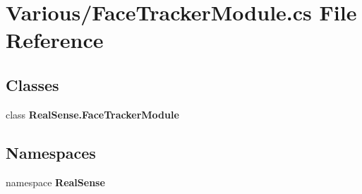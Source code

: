 \section{Various/\+Face\+Tracker\+Module.cs File Reference}
\label{_face_tracker_module_8cs}
\subsection*{Classes}
\begin{DoxyCompactItemize}
\item 
class \textbf{ Real\+Sense.\+Face\+Tracker\+Module}
\end{DoxyCompactItemize}
\subsection*{Namespaces}
\begin{DoxyCompactItemize}
\item 
namespace \textbf{ Real\+Sense}
\end{DoxyCompactItemize}
